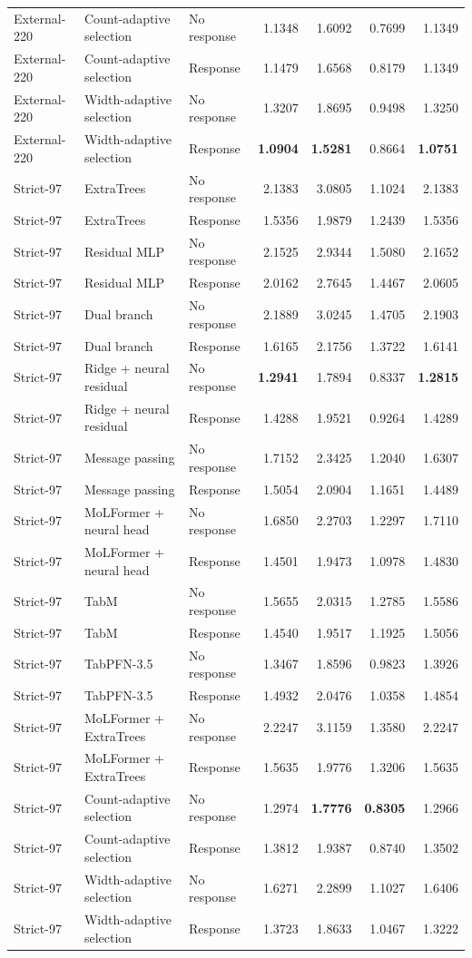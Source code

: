 \begin{longtable}{@{}lp{3.8cm}lrrrr@{}}
External-220 & Count-adaptive selection & No response & 1.1348 & 1.6092 & 0.7699 & 1.1349 \\
External-220 & Count-adaptive selection & Response & 1.1479 & 1.6568 & 0.8179 & 1.1349 \\
External-220 & Width-adaptive selection & No response & 1.3207 & 1.8695 & 0.9498 & 1.3250 \\
External-220 & Width-adaptive selection & Response & \textbf{1.0904} & \textbf{1.5281} & 0.8664 & \textbf{1.0751} \\
\pagebreak
Strict-97 & ExtraTrees & No response & 2.1383 & 3.0805 & 1.1024 & 2.1383 \\
Strict-97 & ExtraTrees & Response & 1.5356 & 1.9879 & 1.2439 & 1.5356 \\
Strict-97 & Residual MLP & No response & 2.1525 & 2.9344 & 1.5080 & 2.1652 \\
Strict-97 & Residual MLP & Response & 2.0162 & 2.7645 & 1.4467 & 2.0605 \\
Strict-97 & Dual branch & No response & 2.1889 & 3.0245 & 1.4705 & 2.1903 \\
Strict-97 & Dual branch & Response & 1.6165 & 2.1756 & 1.3722 & 1.6141 \\
Strict-97 & Ridge + neural residual & No response & \textbf{1.2941} & 1.7894 & 0.8337 & \textbf{1.2815} \\
Strict-97 & Ridge + neural residual & Response & 1.4288 & 1.9521 & 0.9264 & 1.4289 \\
Strict-97 & Message passing & No response & 1.7152 & 2.3425 & 1.2040 & 1.6307 \\
Strict-97 & Message passing & Response & 1.5054 & 2.0904 & 1.1651 & 1.4489 \\
Strict-97 & MoLFormer + neural head & No response & 1.6850 & 2.2703 & 1.2297 & 1.7110 \\
Strict-97 & MoLFormer + neural head & Response & 1.4501 & 1.9473 & 1.0978 & 1.4830 \\
Strict-97 & TabM & No response & 1.5655 & 2.0315 & 1.2785 & 1.5586 \\
Strict-97 & TabM & Response & 1.4540 & 1.9517 & 1.1925 & 1.5056 \\
Strict-97 & TabPFN-3.5 & No response & 1.3467 & 1.8596 & 0.9823 & 1.3926 \\
Strict-97 & TabPFN-3.5 & Response & 1.4932 & 2.0476 & 1.0358 & 1.4854 \\
Strict-97 & MoLFormer + ExtraTrees & No response & 2.2247 & 3.1159 & 1.3580 & 2.2247 \\
Strict-97 & MoLFormer + ExtraTrees & Response & 1.5635 & 1.9776 & 1.3206 & 1.5635 \\
Strict-97 & Count-adaptive selection & No response & 1.2974 & \textbf{1.7776} & \textbf{0.8305} & 1.2966 \\
Strict-97 & Count-adaptive selection & Response & 1.3812 & 1.9387 & 0.8740 & 1.3502 \\
Strict-97 & Width-adaptive selection & No response & 1.6271 & 2.2899 & 1.1027 & 1.6406 \\
Strict-97 & Width-adaptive selection & Response & 1.3723 & 1.8633 & 1.0467 & 1.3222 \\
\bottomrule\end{longtable}
